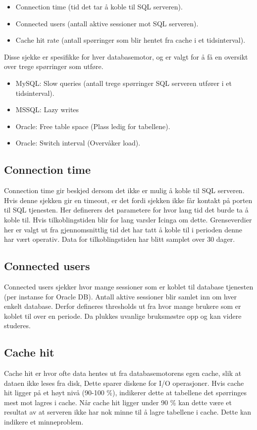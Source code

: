 \begin{itemize}
	\item Connection time (tid det tar å koble til SQL serveren).
	\item Connected users (antall aktive sessioner mot SQL serveren).
	\item Cache hit rate (antall spørringer som blir hentet fra cache i et tidsinterval).
\end{itemize}

Disse sjekke er spesifikke for hver databasemotor, og er valgt for å få en oversikt over trege spørringer som utføre.

\begin{itemize}
\item MySQL: Slow queries (antall trege spørringer SQL serveren utfører i et tidsinterval).
\item MSSQL: Lazy writes
\item Oracle: Free table space (Plass ledig for tabellene).
\item Oracle: Switch interval (Overvåker load).
\end{itemize}

\subsection*{Connection time}
Connection time gir beskjed dersom det ikke er mulig å koble til SQL serveren. Hvis denne sjekken gir en timeout, er det fordi sjekken ikke får kontakt på porten til SQL tjenesten. Her definerers det parametere for hvor lang tid det burde ta å koble til. Hvis tilkoblingstiden blir for lang varsler Icinga om dette. Grenseverdier her er valgt ut fra gjennomsnittlig tid det har tatt å koble til i perioden denne har vært operativ. Data for tilkoblingstiden har blitt samplet over 30 dager.

\subsection*{Connected users}
Connected users sjekker hvor mange sessioner som er koblet til database tjenesten (per instanse for Oracle DB). Antall aktive sessioner blir samlet inn om hver enkelt database. Derfor defineres thresholds ut fra hvor mange brukere som er koblet til over en periode. Da plukkes uvanlige bruksmøstre opp og kan videre studeres.

\subsection*{Cache hit}
Cache hit er hvor ofte data hentes ut fra databasemotorens egen cache, slik at dataen ikke leses fra disk, Dette sparer diskene for I/O operasjoner. Hvis cache hit ligger på et høyt nivå (90-100 \%), indikerer dette at tabellene det spørringes mest mot lagres i cache. Når cache hit ligger under 90 \% kan dette være et resultat av at serveren ikke har nok minne til å lagre tabellene i cache. Dette kan indikere et minneproblem.

